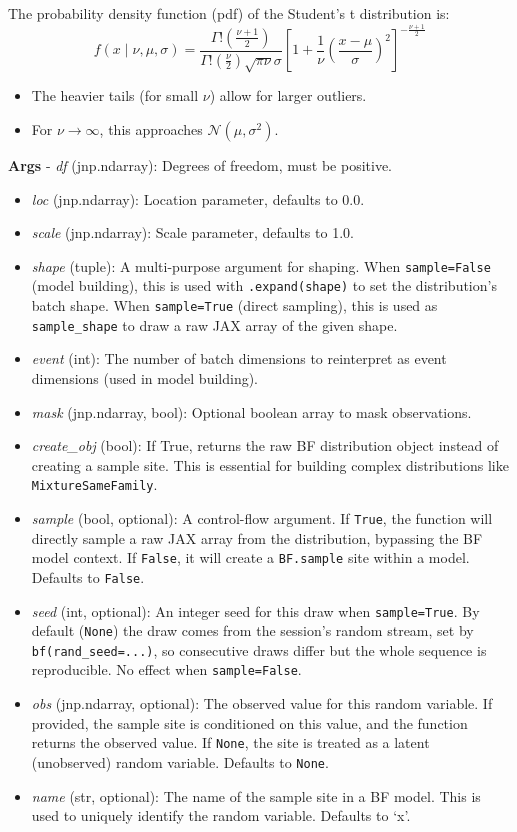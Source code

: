 \documentclass[
  letterpaper,
  DIV=11,
  numbers=noendperiod]{scrartcl}
\providecommand{\tightlist}{%
  \setlength{\itemsep}{0pt}\setlength{\parskip}{0pt}}\usepackage{longtable,booktabs,array}
\begin{document}
The probability density function (pdf) of the Student's t distribution
is: \[
  f(x \mid \nu, \mu, \sigma) = \frac{\Gamma!\left(\frac{\nu+1}{2}\right)}
  {\Gamma!\left(\frac{\nu}{2}\right)\sqrt{\pi\nu}\sigma}
  \left[1 + \frac{1}{\nu}
  \left(\frac{x - \mu}{\sigma}\right)^2
  \right]^{-\frac{\nu+1}{2}}
  \]

\begin{itemize}
\tightlist
\item
  The heavier tails (for small \(ν\)) allow for larger outliers.
\item
  For \(\nu \to \infty\), this approaches
  \(\mathcal{N}(\mu, \sigma^2)\).
\end{itemize}

\textbf{Args} - \emph{df} (jnp.ndarray): Degrees of freedom, must be
positive.

\begin{itemize}
\item
  \emph{loc} (jnp.ndarray): Location parameter, defaults to 0.0.
\item
  \emph{scale} (jnp.ndarray): Scale parameter, defaults to 1.0.
\item
  \emph{shape} (tuple): A multi-purpose argument for shaping. When
  \texttt{sample=False} (model building), this is used with
  \texttt{.expand(shape)} to set the distribution's batch shape. When
  \texttt{sample=True} (direct sampling), this is used as
  \texttt{sample\_shape} to draw a raw JAX array of the given shape.
\item
  \emph{event} (int): The number of batch dimensions to reinterpret as
  event dimensions (used in model building).
\item
  \emph{mask} (jnp.ndarray, bool): Optional boolean array to mask
  observations.
\item
  \emph{create\_obj} (bool): If True, returns the raw BF distribution
  object instead of creating a sample site. This is essential for
  building complex distributions like \texttt{MixtureSameFamily}.
\item
  \emph{sample} (bool, optional): A control-flow argument. If
  \texttt{True}, the function will directly sample a raw JAX array from
  the distribution, bypassing the BF model context. If \texttt{False},
  it will create a \texttt{BF.sample} site within a model. Defaults to
  \texttt{False}.
\item
  \emph{seed} (int, optional): An integer seed for this draw when
  \texttt{sample=True}. By default (\texttt{None}) the draw comes from
  the session's random stream, set by \texttt{bf(rand\_seed=...)}, so
  consecutive draws differ but the whole sequence is reproducible. No
  effect when \texttt{sample=False}.
\item
  \emph{obs} (jnp.ndarray, optional): The observed value for this random
  variable. If provided, the sample site is conditioned on this value,
  and the function returns the observed value. If \texttt{None}, the
  site is treated as a latent (unobserved) random variable. Defaults to
  \texttt{None}.
\item
  \emph{name} (str, optional): The name of the sample site in a BF
  model. This is used to uniquely identify the random variable. Defaults
  to `x'.
\end{itemize}
\end{document}
